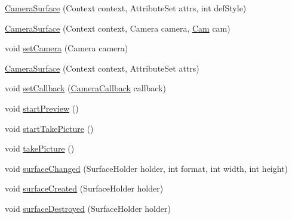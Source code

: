 \begin{DoxyCompactItemize}
\item 
\hyperlink{classswp_1_1tuilmenau_1_1carduinodroid_1_1controller_1_1_camera_surface_a1c578c6418952fd170916dad67e26152}{Camera\+Surface} (Context context, Attribute\+Set attrs, int def\+Style)
\item 
\hyperlink{classswp_1_1tuilmenau_1_1carduinodroid_1_1controller_1_1_camera_surface_a51856c105777cea804768ed2be7f7aa4}{Camera\+Surface} (Context context, Camera camera, \hyperlink{classswp_1_1tuilmenau_1_1carduinodroid_1_1controller_1_1_cam}{Cam} cam)
\item 
void \hyperlink{classswp_1_1tuilmenau_1_1carduinodroid_1_1controller_1_1_camera_surface_ac0aa798901364be1828f205d940caf4d}{set\+Camera} (Camera camera)
\item 
\hyperlink{classswp_1_1tuilmenau_1_1carduinodroid_1_1controller_1_1_camera_surface_a194d84cc79b5b31f67e620d781438ed3}{Camera\+Surface} (Context context, Attribute\+Set attrs)
\item 
void \hyperlink{classswp_1_1tuilmenau_1_1carduinodroid_1_1controller_1_1_camera_surface_ae9a5ce16713f1cfdb31de1fd212b25e5}{set\+Callback} (\hyperlink{interfaceswp_1_1tuilmenau_1_1carduinodroid_1_1controller_1_1_camera_callback}{Camera\+Callback} callback)
\item 
void \hyperlink{classswp_1_1tuilmenau_1_1carduinodroid_1_1controller_1_1_camera_surface_af09140f0c6c04a3ab83867c9abbd4276}{start\+Preview} ()
\item 
void \hyperlink{classswp_1_1tuilmenau_1_1carduinodroid_1_1controller_1_1_camera_surface_a05163b152120d5aafe3f5d3636d067b3}{start\+Take\+Picture} ()
\item 
void \hyperlink{classswp_1_1tuilmenau_1_1carduinodroid_1_1controller_1_1_camera_surface_a1060767f277e105ef471cc9e299d94bf}{take\+Picture} ()
\item 
void \hyperlink{classswp_1_1tuilmenau_1_1carduinodroid_1_1controller_1_1_camera_surface_a13e24d8a91a594a27cd66f52725de994}{surface\+Changed} (Surface\+Holder holder, int format, int width, int height)
\item 
void \hyperlink{classswp_1_1tuilmenau_1_1carduinodroid_1_1controller_1_1_camera_surface_a714c66493b927383d94a844b742181b8}{surface\+Created} (Surface\+Holder holder)
\item 
void \hyperlink{classswp_1_1tuilmenau_1_1carduinodroid_1_1controller_1_1_camera_surface_ad8a4854496d3186224ff6a86ae1c343c}{surface\+Destroyed} (Surface\+Holder holder)
\item 

\end{DoxyCompactItemize}
